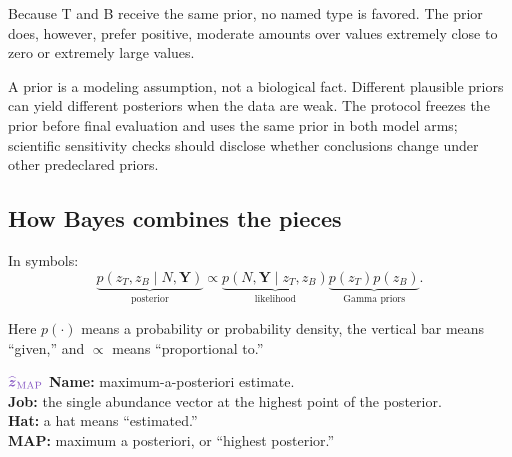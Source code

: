 \documentclass[11pt]{article}
\newcommand{\unknownq}[1]{\textcolor{unknownpurple}{#1}}
\begin{document}
Because T and B receive the same prior, no named type is favored. The prior does,
however, prefer positive, moderate amounts over values extremely close to zero or
extremely large values.

\begin{watchout}
A prior is a modeling assumption, not a biological fact. Different plausible
priors can yield different posteriors when the data are weak. The protocol freezes
the prior before final evaluation and uses the same prior in both model arms;
scientific sensitivity checks should disclose whether conclusions change under
other predeclared priors.
\end{watchout}

\subsection{How Bayes combines the pieces}

\begin{center}
\end{center}

In symbols:
\[
\underbrace{p(z_T,z_B\mid N,\boldsymbol Y)}_{\text{posterior}}
\propto
\underbrace{p(N,\boldsymbol Y\mid z_T,z_B)}_{\text{likelihood}}
\underbrace{p(z_T)p(z_B)}_{\text{Gamma priors}}.
\]

Here \(p(\cdot)\) means a probability or probability density, the vertical bar
means “given,” and \(\propto\) means “proportional to.”

\begin{newvar}{\(\unknownq{\widehat{\boldsymbol z}_{\mathrm{MAP}}}\)}
\textbf{Name:} maximum-a-posteriori estimate.\\
\textbf{Job:} the single abundance vector at the highest point of the posterior.\\
\textbf{Hat:} a hat means “estimated.”\\
\textbf{MAP:} maximum a posteriori, or “highest posterior.”
\end{newvar}
\end{document}
